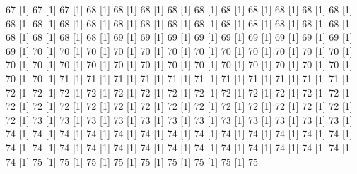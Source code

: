 \documentclass[12pt]{article}
\begin{document}
\begin{Schunk}
\begin{Soutput}
[1] 67%
[1] 67%
[1] 67%
[1] 68%
[1] 68%
[1] 68%
[1] 68%
[1] 68%
[1] 68%
[1] 68%
[1] 68%
[1] 68%
[1] 68%
[1] 68%
[1] 68%
[1] 68%
[1] 68%
[1] 68%
[1] 68%
[1] 68%
[1] 68%
[1] 68%
[1] 68%
[1] 68%
[1] 68%
[1] 68%
[1] 68%
[1] 68%
[1] 68%
[1] 68%
[1] 69%
[1] 69%
[1] 69%
[1] 69%
[1] 69%
[1] 69%
[1] 69%
[1] 69%
[1] 69%
[1] 69%
[1] 70%
[1] 70%
[1] 70%
[1] 70%
[1] 70%
[1] 70%
[1] 70%
[1] 70%
[1] 70%
[1] 70%
[1] 70%
[1] 70%
[1] 70%
[1] 70%
[1] 70%
[1] 70%
[1] 70%
[1] 70%
[1] 70%
[1] 70%
[1] 70%
[1] 70%
[1] 70%
[1] 70%
[1] 70%
[1] 70%
[1] 70%
[1] 71%
[1] 71%
[1] 71%
[1] 71%
[1] 71%
[1] 71%
[1] 71%
[1] 71%
[1] 71%
[1] 71%
[1] 71%
[1] 72%
[1] 72%
[1] 72%
[1] 72%
[1] 72%
[1] 72%
[1] 72%
[1] 72%
[1] 72%
[1] 72%
[1] 72%
[1] 72%
[1] 72%
[1] 72%
[1] 72%
[1] 72%
[1] 72%
[1] 72%
[1] 72%
[1] 72%
[1] 72%
[1] 72%
[1] 72%
[1] 72%
[1] 72%
[1] 72%
[1] 72%
[1] 73%
[1] 73%
[1] 73%
[1] 73%
[1] 73%
[1] 73%
[1] 73%
[1] 73%
[1] 73%
[1] 73%
[1] 73%
[1] 73%
[1] 74%
[1] 74%
[1] 74%
[1] 74%
[1] 74%
[1] 74%
[1] 74%
[1] 74%
[1] 74%
[1] 74%
[1] 74%
[1] 74%
[1] 74%
[1] 74%
[1] 74%
[1] 74%
[1] 74%
[1] 74%
[1] 74%
[1] 74%
[1] 74%
[1] 74%
[1] 74%
[1] 74%
[1] 74%
[1] 74%
[1] 74%
[1] 75%
[1] 75%
[1] 75%
[1] 75%
[1] 75%
[1] 75%
[1] 75%
[1] 75%
[1] 75%

\end{Soutput}
\end{Schunk}
\end{document}
